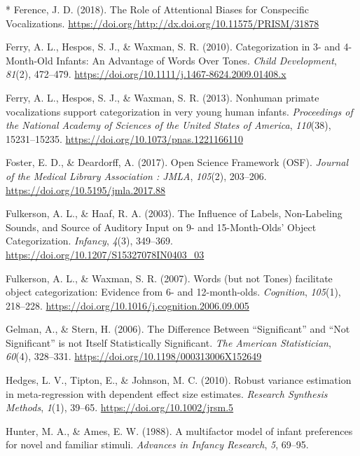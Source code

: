 \documentclass[man]{apa6}
\begin{document}
\hypertarget{ref-ference_role_2018}{}
{*} Ference, J. D. (2018). The Role of Attentional Biases for
Conspecific Vocalizations.
\url{https://doi.org/http://dx.doi.org/10.11575/PRISM/31878}

\hypertarget{ref-ferry_categorization_2010}{}
Ferry, A. L., Hespos, S. J., \& Waxman, S. R. (2010). Categorization in
3- and 4-Month-Old Infants: An Advantage of Words Over Tones.
\emph{Child Development}, \emph{81}(2), 472--479.
\url{https://doi.org/10.1111/j.1467-8624.2009.01408.x}

\hypertarget{ref-ferry_nonhuman_2013}{}
Ferry, A. L., Hespos, S. J., \& Waxman, S. R. (2013). Nonhuman primate
vocalizations support categorization in very young human infants.
\emph{Proceedings of the National Academy of Sciences of the United
States of America}, \emph{110}(38), 15231--15235.
\url{https://doi.org/10.1073/pnas.1221166110}

\hypertarget{ref-foster_open_2017}{}
Foster, E. D., \& Deardorff, A. (2017). Open Science Framework (OSF).
\emph{Journal of the Medical Library Association : JMLA}, \emph{105}(2),
203--206. \url{https://doi.org/10.5195/jmla.2017.88}

\hypertarget{ref-fulkerson_influence_2003}{}
Fulkerson, A. L., \& Haaf, R. A. (2003). The Influence of Labels,
Non-Labeling Sounds, and Source of Auditory Input on 9- and
15-Month-Olds' Object Categorization. \emph{Infancy}, \emph{4}(3),
349--369. \url{https://doi.org/10.1207/S15327078IN0403_03}

\hypertarget{ref-fulkerson_words_2007}{}
Fulkerson, A. L., \& Waxman, S. R. (2007). Words (but not Tones)
facilitate object categorization: Evidence from 6- and 12-month-olds.
\emph{Cognition}, \emph{105}(1), 218--228.
\url{https://doi.org/10.1016/j.cognition.2006.09.005}

\hypertarget{ref-gelman_difference_2006}{}
Gelman, A., \& Stern, H. (2006). The Difference Between ``Significant''
and ``Not Significant'' is not Itself Statistically Significant.
\emph{The American Statistician}, \emph{60}(4), 328--331.
\url{https://doi.org/10.1198/000313006X152649}

\hypertarget{ref-hedges_robust_2010}{}
Hedges, L. V., Tipton, E., \& Johnson, M. C. (2010). Robust variance
estimation in meta-regression with dependent effect size estimates.
\emph{Research Synthesis Methods}, \emph{1}(1), 39--65.
\url{https://doi.org/10.1002/jrsm.5}

\hypertarget{ref-hunter_multifactor_1988}{}
Hunter, M. A., \& Ames, E. W. (1988). A multifactor model of infant
preferences for novel and familiar stimuli. \emph{Advances in Infancy
Research}, \emph{5}, 69--95.
\end{document}
